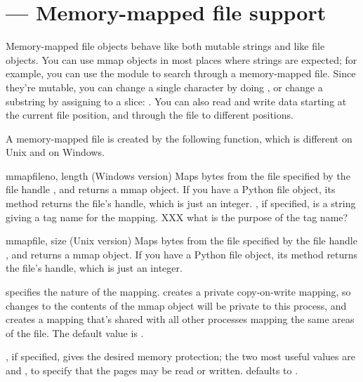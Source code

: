 \section{ ---
	Memory-mapped file support}


Memory-mapped file objects behave like both mutable strings and like
file objects.  You can use mmap objects in most places where strings
are expected; for example, you can use the  module to
search through a memory-mapped file.  Since they're mutable, you can
change a single character by doing , or
change a substring by assigning to a slice:
.  You can also read and write
data starting at the current file position, and 
through the file to different positions.

A memory-mapped file is created by the following function, which is
different on Unix and on Windows.

\begin{funcdesc}{mmap}{fileno, length  }
(Windows version) Maps  bytes from the file specified by
the file handle , and returns a mmap object.  If you have
a Python file object, its
 method returns the file's handle, which is just an integer.
, if specified, is a string giving a tag name for the mapping. XXX what is the purpose of the tag name?
\end{funcdesc}

\begin{funcdesc}{mmap}{file, size }
(Unix version) Maps  bytes from the file specified by the
file handle , and returns a mmap object.  If you have a
Python file object, its  method returns the file's
handle, which is just an integer.

 specifies the nature of the mapping.  
 creates a private copy-on-write mapping, so
changes to the contents of the mmap object will be private to this
process, and  creates a mapping that's shared
with all other processes mapping the same areas of the file.
The default value is .

, if specified, gives the desired memory protection; the two 
most useful values are  and , to
specify that the pages may be read or written.
 defaults to .
\end{funcdesc}


